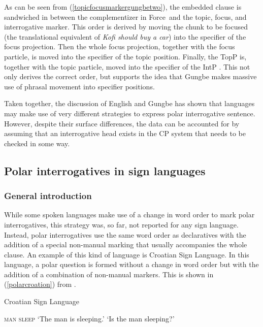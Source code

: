 \noindent As can be seen from (\ref{topicfocusmarkergungbetwo}), the embedded clause is sandwiched in between the complementizer in Force\textdegree\ and the topic, focus, and interrogative marker. This order is derived by moving the chunk to be focused (the translational equivalent of \textit{Kofi should buy a car}) into the specifier of the focus projection. Then the whole focus projection, together with the focus particle, is moved into the specifier of the topic position. Finally, the TopP is, together with the topic particle, moved into the specifier of the IntP \citep[184]{aboh2004left}. This not only derives the correct order, but supports the idea that Gungbe makes massive use of phrasal movement into specifier positions.

Taken together, the discussion of English and Gungbe has shown that languages may make use of very different strategies to express polar interrogative sentence. However, despite their surface differences, the data can be accounted for by assuming that an interrogative head exists in the CP system that needs to be checked in some way.

\subsection{Polar interrogatives in sign languages}\label{polarintsign}



\subsubsection{General introduction}
While some spoken languages make use of a change in word order to mark polar interrogatives, this strategy was, so far, not reported for any sign language. Instead, polar interrogatives use the same word order as declaratives with the addition of a special non-manual marking that usually accompanies the whole clause. An example of this kind of language is Croatian Sign Language. In this language, a polar question is formed without a change in word order but with the addition of a combination of non-manual markers. This is shown in (\ref{polarcroation}) from \citet[157]{sarac2006interrogative}.

\begin{exe}
\ex Croatian Sign Language\label{polarcroation}\begin{xlist}
\ex \textsc{man sleep}
\glt `The man is sleeping.' \label{polarcroationa} 
\ex {}
\glt `Is the man sleeping?' \label{polarcroationb} 
\end{xlist}
\end{exe}


